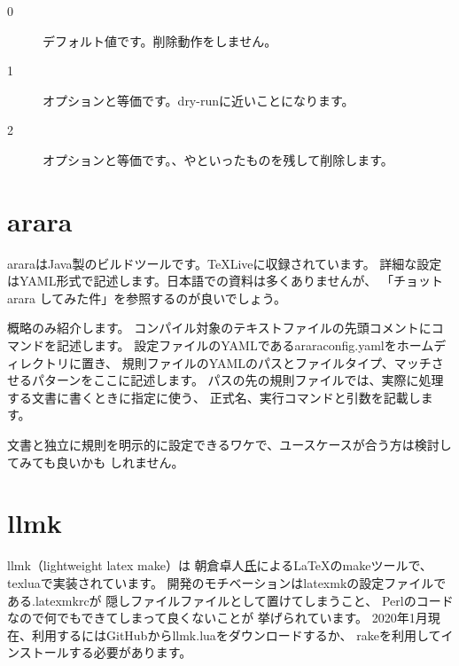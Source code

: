 \documentclass[main]{subfiles}
\begin{document}
\begin{description}
    \item[0]{デフォルト値です。削除動作をしません。}
    \item[1]{オプションと等価です。dry-runに近いことになります。}
    \item[2]{オプションと等価です。、やといったものを残して削除します。}
\end{description}


\section{arara}
arara\cite{ctan:arara}はJava製のビルドツールです。\TeX{}Liveに収録されています。
詳細な設定はYAML形式で記述します。日本語での資料は多くありませんが、
「チョット arara してみた件」\cite{zr:arara}を参照するのが良いでしょう。

概略のみ紹介します。
コンパイル対象のテキストファイルの先頭コメントにコマンドを記述します。
設定ファイルのYAMLであるararaconfig.yamlをホームディレクトリに置き、
規則ファイルのYAMLのパスとファイルタイプ、マッチさせるパターンをここに記述します。
パスの先の規則ファイルでは、実際に処理する文書に書くときに指定に使う、
正式名、実行コマンドと引数を記載します。

文書と独立に規則を明示的に設定できるワケで、ユースケースが合う方は検討してみても良いかも
しれません。

\section{llmk}
llmk\cite{wtsnjp:llmk}（lightweight latex make）は
朝倉卓人\href{https://twitter.com/wtsnjp}氏による\LaTeX{}のmakeツールで、
texluaで実装されています。
開発のモチベーションはlatexmkの設定ファイルである.latexmkrcが
隠しファイルファイルとして置けてしまうこと、
Perlのコードなので何でもできてしまって良くないことが
挙げられています\cite{wtsnjp:blog-llmk}。
2020年1月現在、利用するにはGitHubからllmk.luaをダウンロードするか、
rakeを利用してインストールする必要があります。
\end{document}
